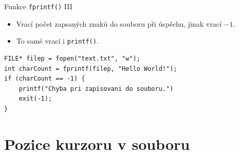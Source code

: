\documentclass[14pt,aspectratio=169]{beamer}
\begin{document}
    \begin{frame}[t,fragile]{Funkce \texttt{fprintf()} \textrm{III}}
        \begin{itemize}
            \item Vrací počet zapsaných znaků do souboru při úspěchu, jinak vrací $-1$.
            \item To samé vrací i \texttt{printf()}.
        \end{itemize}
        \begin{lstlisting}
FILE* filep = fopen("text.txt", "w");
int charCount = fprintf(filep, "Hello World!");
if (charCount == -1) {
    printf("Chyba pri zapisovani do souboru.")
    exit(-1);
}
        \end{lstlisting}
    \end{frame}

    \section{Pozice kurzoru v souboru}
\end{document}
